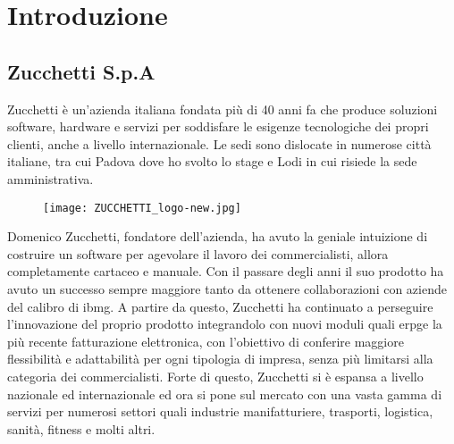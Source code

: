 
\chapter{Introduzione}
\label{cap:introduzione}





\section{Zucchetti S.p.A}
Zucchetti è un'azienda italiana fondata più di 40 anni fa che produce soluzioni software, hardware e servizi per soddisfare le esigenze tecnologiche dei propri clienti, anche a livello internazionale. Le sedi sono dislocate in numerose città italiane, tra cui Padova dove ho svolto lo stage e Lodi in cui risiede la sede amministrativa.


\begin{figure}[htbp]
	\begin{center}
		\texttt{[image: ZUCCHETTI\_logo-new.jpg]}
	\end{center}
\end{figure}

Domenico Zucchetti, fondatore dell'azienda, ha avuto la geniale intuizione di costruire un software per agevolare il lavoro dei commercialisti, allora completamente cartaceo e manuale. Con il passare degli anni il suo prodotto ha avuto un successo sempre maggiore tanto da ottenere collaborazioni con aziende del calibro di \gls{ibmg}\glsfirstoccur. A partire da questo, Zucchetti ha continuato a perseguire l'innovazione del proprio prodotto integrandolo con nuovi moduli quali \gls{erpg}\glsfirstoccur e la più recente fatturazione elettronica, con l'obiettivo di conferire maggiore flessibilità e adattabilità per ogni tipologia di impresa, senza più limitarsi alla categoria dei commercialisti. Forte di questo, Zucchetti si è espansa a livello nazionale ed internazionale ed ora si pone sul mercato con una vasta gamma di servizi per numerosi settori quali industrie manifatturiere, trasporti, logistica, sanità, fitness e molti altri. \\

